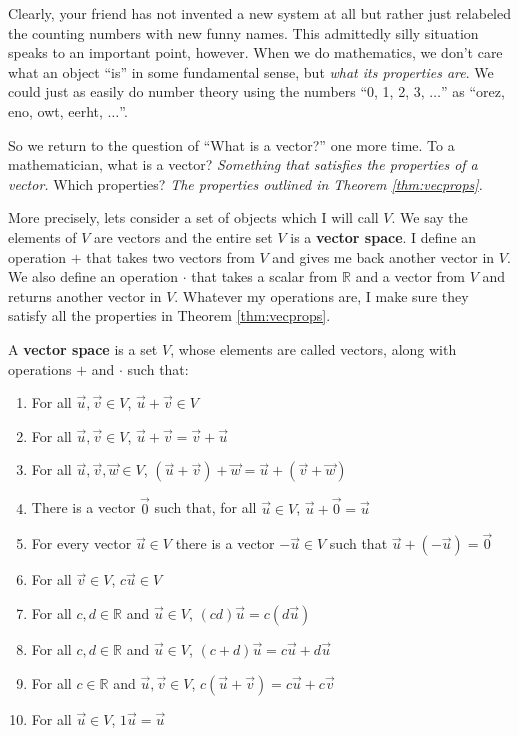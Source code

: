 Clearly, your friend has not invented a new system at all but rather just relabeled the counting numbers with new funny names. This admittedly silly situation speaks to an important point, however. When we do mathematics, we don't care what an object ``is'' in some fundamental sense, but \textit{what its properties are}. We could just as easily do number theory using the numbers ``0, 1, 2, 3, $\ldots$'' as ``orez, eno, owt, eerht, $\ldots$''.

So we return to the question of ``What is a vector?'' one more time. To a mathematician, what is a vector? \textit{Something that satisfies the properties of a vector.} Which properties? \textit{The properties outlined in Theorem \ref{thm:vecprops}.}

More precisely, lets consider a set of objects which I will call $V$. We say the elements of $V$ are vectors and the entire set $V$ is a \textbf{vector space}. I define an operation $+$ that takes two vectors from $V$ and gives me back another vector in $V$. We also define an operation $\cdot$ that takes a scalar from $\mathbb{R}$ and a vector from $V$ and returns another vector in $V$. Whatever my operations are, I make sure they satisfy all the properties in Theorem \ref{thm:vecprops}.

\begin{definition}\label{def:vecspace}
	A \textbf{vector space} is a set $V$, whose elements are called vectors, along with operations $+$ and $\cdot$ such that:
	\begin{enumerate}
		\item For all $\vec{u}, \vec{v} \in V$, $\vec{u} + \vec{v} \in V$
		\item For all $\vec{u}, \vec{v} \in V$, $\vec{u} + \vec{v} = \vec{v} + \vec{u}$
		\item For all $\vec{u}, \vec{v}, \vec{w} \in V$,  $(\vec{u}+\vec{v}) + \vec{w} = \vec{u} + (\vec{v}+\vec{w})$
		\item There is a vector $\vec{0}$ such that, for all $\vec{u}\in V$, $\vec{u} + \vec{0} = \vec{u}$
		\item For every vector $\vec{u}\in V$ there is a vector $-\vec{u} \in V$ such that $\vec{u} + (-\vec{u}) = \vec{0}$
		\item For all $\vec{v} \in V$, $c\vec{u} \in V$
		\item For all $c,d \in \mathbb{R}$ and $\vec{u} \in V$, $(cd)\vec{u} = c(d\vec{u})$
		\item For all $c,d \in \mathbb{R}$ and $\vec{u} \in V$, $(c+d)\vec{u} = c\vec{u} + d\vec{u}$
		\item For all $c\in \mathbb{R}$ and $\vec{u},\vec{v} \in V$, $c(\vec{u} + \vec{v}) = c\vec{u} + c\vec{v}$
		\item For all $\vec{u} \in V$, $1\vec{u} = \vec{u}$
	\end{enumerate}
\end{definition}

